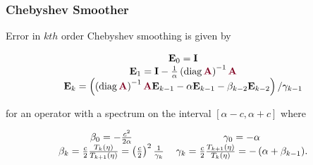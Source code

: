 \documentclass{beamer}
\DeclareMathOperator{\diag}{diag}
\begin{document}
\begin{frame}
\begin{center}
\frametitle{Chebyshev Smoother}

Error in $kth$ order Chebyshev smoothing is given by

\begin{equation}
\begin{tabular}{c}
$\mathbf{E}_0 = \mathbf{I}$\\
$\mathbf{E}_1 = \mathbf{I} - \frac{1}{\alpha} \left( \diag {\color{burgundy}\mathbf{A}} \right)^{-1} {\color{burgundy}\mathbf{A}}$\\
$\mathbf{E}_k = \left( \left( \diag {\color{burgundy}\mathbf{A}} \right)^{-1} {\color{burgundy}\mathbf{A}} \mathbf{E}_{k - 1} - \alpha \mathbf{E}_{k - 1} - \beta_{k - 2} \mathbf{E}_{k - 2} \right) / \gamma_{k - 1}$
\end{tabular}
\label{eq:chebyshev_error_propagation}
\end{equation}

for an operator with a spectrum on the interval $\left[ \alpha - c, \alpha + c \right]$ where

\begin{equation}
\begin{tabular}{c c}
$\beta_0 = - \frac{c^2}{2 \alpha}$ & $\gamma_0 = - \alpha$\\
$\beta_k = \frac{c}{2} \frac{T_k \left( \eta \right)}{T_{k + 1} \left( \eta \right)} = \left( \frac{c}{2} \right)^2 \frac{1}{\gamma_k}$ & $\gamma_k = \frac{c}{2} \frac{T_{k + 1} \left( \eta \right)}{T_k \left( \eta \right)} = - \left( \alpha + \beta_{k - 1} \right)$.
\end{tabular}
\end{equation}

\end{center}
\end{frame}

\end{document}
